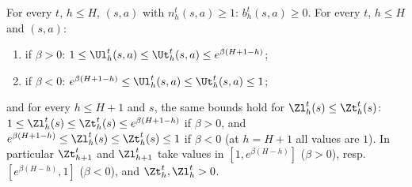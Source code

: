 \begin{lemma}\label{lem:backups_range}
\leanok
{}
For every $t$, $h \le H$, $(s, a)$ with $n_h^t(s, a) \ge 1$: $b_h^t(s, a) \ge 0$. For every $t$,
$h \le H$ and $(s, a)$:
\begin{enumerate}
  \item[(i)] if $\beta > 0$: $1 \le \Ul^t_h(s, a) \le \Ut^t_h(s, a) \le e^{\beta(H + 1 - h)}$;
  \item[(ii)] if $\beta < 0$: $e^{\beta(H + 1 - h)} \le \Ul^t_h(s, a) \le \Ut^t_h(s, a) \le 1$;
\end{enumerate}
and for every $h \le H + 1$ and $s$, the same bounds hold for $\Zl^t_h(s) \le \Zt^t_h(s)$:
$1 \le \Zl^t_h(s) \le \Zt^t_h(s) \le e^{\beta(H + 1 - h)}$ if $\beta > 0$, and
$e^{\beta(H + 1 - h)} \le \Zl^t_h(s) \le \Zt^t_h(s) \le 1$ if $\beta < 0$ (at $h = H + 1$ all
values are $1$). In particular $\Zt^t_{h+1}$ and $\Zl^t_{h+1}$ take values in $[1, e^{\beta(H - h)}]$
($\beta > 0$), resp.\ $[e^{\beta(H - h)}, 1]$ ($\beta < 0$), and $\Zt^t_h, \Zl^t_h > 0$.
\end{lemma}

